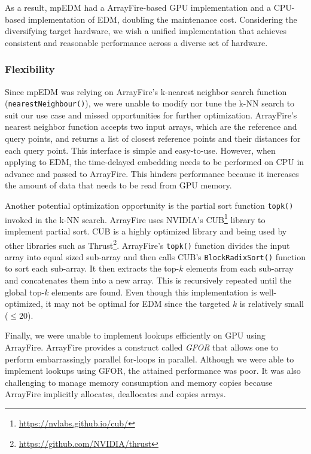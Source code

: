 \documentclass[conference]{IEEEtran}
\begin{document}
As a result, mpEDM had a ArrayFire-based GPU implementation and a CPU-based
implementation of EDM, doubling the maintenance cost. Considering the
diversifying target hardware, we wish a unified implementation that achieves
consistent and reasonable performance across a diverse set of hardware.

\subsubsection{Flexibility}

Since mpEDM was relying on ArrayFire's k-nearest neighbor search function
(\texttt{nearestNeighbour()}), we were unable to modify nor tune the k-NN
search to suit our use case and missed opportunities for further optimization.
ArrayFire's nearest neighbor function accepts two input arrays, which are the
reference and query points, and returns a list of closest reference points and
their distances for each query point. This interface is simple and
easy-to-use. However, when applying to EDM, the time-delayed embedding needs
to be performed on CPU in advance and passed to ArrayFire. This hinders
performance because it increases the amount of data that needs to be read from
GPU memory.

Another potential optimization opportunity is the partial sort function
\texttt{topk()} invoked in the k-NN search. ArrayFire uses NVIDIA's
CUB\footnote{\url{https://nvlabs.github.io/cub/}} library to implement partial
sort. CUB is a highly optimized library and being used by other libraries such
as Thrust\footnote{\url{https://github.com/NVIDIA/thrust}}. ArrayFire's
\texttt{topk()} function divides the input array into equal sized sub-array
and then calls CUB's \texttt{BlockRadixSort()} function to sort each
sub-array. It then extracts the top-$k$ elements from each sub-array and
concatenates them into a new array. This is recursively repeated until the
global top-$k$ elements are found. Even though this implementation is
well-optimized, it may not be optimal for EDM since the targeted $k$ is
relatively small ($\leq 20$).

Finally, we were unable to implement lookups efficiently on GPU using
ArrayFire. ArrayFire provides a construct called \textit{GFOR} that allows one
to perform embarrassingly parallel for-loops in parallel. Although we were
able to implement lookups using GFOR, the attained performance was poor. It
was also challenging to manage memory consumption and memory copies because
ArrayFire implicitly allocates, deallocates and copies arrays.
\end{document}
